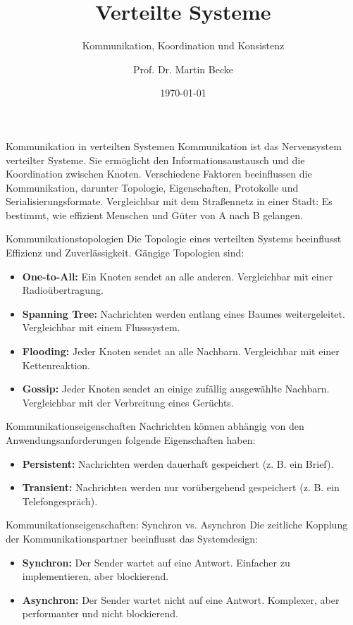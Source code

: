 \documentclass{beamer}
\title{Verteilte Systeme}
\subtitle{Kommunikation, Koordination und Konsistenz}
\author{Prof. Dr. Martin Becke}
\date{\today}
\begin{document}
\begin{frame}
    \titlepage
\end{frame}

\begin{frame}{Kommunikation in verteilten Systemen}
    Kommunikation ist das Nervensystem verteilter Systeme. Sie ermöglicht den Informationsaustausch und die Koordination zwischen Knoten. Verschiedene Faktoren beeinflussen die Kommunikation, darunter Topologie, Eigenschaften, Protokolle und Serialisierungsformate. \newline
    Vergleichbar mit dem Straßennetz in einer Stadt: Es bestimmt, wie effizient Menschen und Güter von A nach B gelangen.
\end{frame}

\begin{frame}{Kommunikationstopologien}
    Die Topologie eines verteilten Systems beeinflusst Effizienz und Zuverlässigkeit. Gängige Topologien sind:
    \begin{itemize}
        \item \textbf{One-to-All:} Ein Knoten sendet an alle anderen. Vergleichbar mit einer Radioübertragung.
        \item \textbf{Spanning Tree:} Nachrichten werden entlang eines Baumes weitergeleitet. Vergleichbar mit einem Flusssystem.
        \item \textbf{Flooding:} Jeder Knoten sendet an alle Nachbarn. Vergleichbar mit einer Kettenreaktion.
        \item \textbf{Gossip:} Jeder Knoten sendet an einige zufällig ausgewählte Nachbarn. Vergleichbar mit der Verbreitung eines Gerüchts.
    \end{itemize}
\end{frame}

\begin{frame}{Kommunikationseigenschaften}
    Nachrichten können abhängig von den Anwendungsanforderungen folgende Eigenschaften haben:
    \begin{itemize}
        \item \textbf{Persistent:} Nachrichten werden dauerhaft gespeichert (z. B. ein Brief).
        \item \textbf{Transient:} Nachrichten werden nur vorübergehend gespeichert (z. B. ein Telefongespräch).
    \end{itemize}
\end{frame}

\begin{frame}{Kommunikationseigenschaften: Synchron vs. Asynchron}
    Die zeitliche Kopplung der Kommunikationspartner beeinflusst das Systemdesign:
    \begin{itemize}
        \item \textbf{Synchron:} Der Sender wartet auf eine Antwort. Einfacher zu implementieren, aber blockierend.
        \item \textbf{Asynchron:} Der Sender wartet nicht auf eine Antwort. Komplexer, aber performanter und nicht blockierend.
    \end{itemize}
\end{frame}
\end{document}
